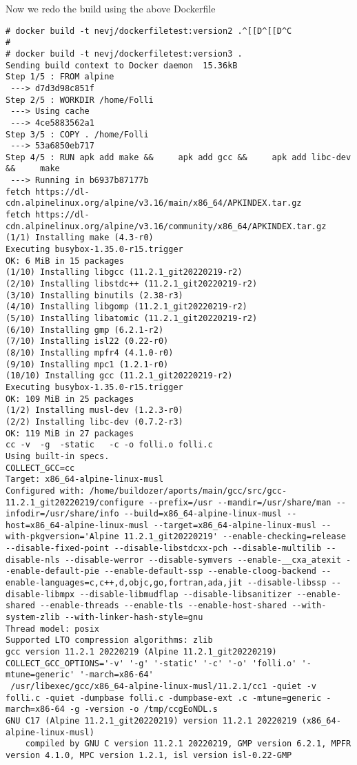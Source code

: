 \documentclass{article}  %
\begin{document}
 Now we redo the build using the above Dockerfile
\begin{verbatim}
# docker build -t nevj/dockerfiletest:version2 .^[[D^[[D^C
# 
# docker build -t nevj/dockerfiletest:version3 .
Sending build context to Docker daemon  15.36kB
Step 1/5 : FROM alpine
 ---> d7d3d98c851f
Step 2/5 : WORKDIR /home/Folli
 ---> Using cache
 ---> 4ce5883562a1
Step 3/5 : COPY . /home/Folli
 ---> 53a6850eb717
Step 4/5 : RUN apk add make &&     apk add gcc &&     apk add libc-dev &&     make
 ---> Running in b6937b87177b
fetch https://dl-cdn.alpinelinux.org/alpine/v3.16/main/x86_64/APKINDEX.tar.gz
fetch https://dl-cdn.alpinelinux.org/alpine/v3.16/community/x86_64/APKINDEX.tar.gz
(1/1) Installing make (4.3-r0)
Executing busybox-1.35.0-r15.trigger
OK: 6 MiB in 15 packages
(1/10) Installing libgcc (11.2.1_git20220219-r2)
(2/10) Installing libstdc++ (11.2.1_git20220219-r2)
(3/10) Installing binutils (2.38-r3)
(4/10) Installing libgomp (11.2.1_git20220219-r2)
(5/10) Installing libatomic (11.2.1_git20220219-r2)
(6/10) Installing gmp (6.2.1-r2)
(7/10) Installing isl22 (0.22-r0)
(8/10) Installing mpfr4 (4.1.0-r0)
(9/10) Installing mpc1 (1.2.1-r0)
(10/10) Installing gcc (11.2.1_git20220219-r2)
Executing busybox-1.35.0-r15.trigger
OK: 109 MiB in 25 packages
(1/2) Installing musl-dev (1.2.3-r0)
(2/2) Installing libc-dev (0.7.2-r3)
OK: 119 MiB in 27 packages
cc -v  -g  -static   -c -o folli.o folli.c
Using built-in specs.
COLLECT_GCC=cc
Target: x86_64-alpine-linux-musl
Configured with: /home/buildozer/aports/main/gcc/src/gcc-11.2.1_git20220219/configure --prefix=/usr --mandir=/usr/share/man --infodir=/usr/share/info --build=x86_64-alpine-linux-musl --host=x86_64-alpine-linux-musl --target=x86_64-alpine-linux-musl --with-pkgversion='Alpine 11.2.1_git20220219' --enable-checking=release --disable-fixed-point --disable-libstdcxx-pch --disable-multilib --disable-nls --disable-werror --disable-symvers --enable-__cxa_atexit --enable-default-pie --enable-default-ssp --enable-cloog-backend --enable-languages=c,c++,d,objc,go,fortran,ada,jit --disable-libssp --disable-libmpx --disable-libmudflap --disable-libsanitizer --enable-shared --enable-threads --enable-tls --enable-host-shared --with-system-zlib --with-linker-hash-style=gnu
Thread model: posix
Supported LTO compression algorithms: zlib
gcc version 11.2.1 20220219 (Alpine 11.2.1_git20220219) 
COLLECT_GCC_OPTIONS='-v' '-g' '-static' '-c' '-o' 'folli.o' '-mtune=generic' '-march=x86-64'
 /usr/libexec/gcc/x86_64-alpine-linux-musl/11.2.1/cc1 -quiet -v folli.c -quiet -dumpbase folli.c -dumpbase-ext .c -mtune=generic -march=x86-64 -g -version -o /tmp/ccgEoNDL.s
GNU C17 (Alpine 11.2.1_git20220219) version 11.2.1 20220219 (x86_64-alpine-linux-musl)
	compiled by GNU C version 11.2.1 20220219, GMP version 6.2.1, MPFR version 4.1.0, MPC version 1.2.1, isl version isl-0.22-GMP


\end{verbatim}
\end{document}
